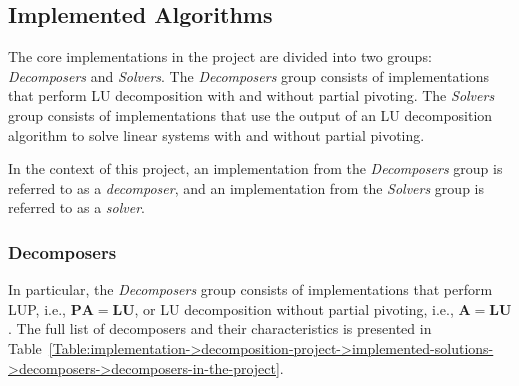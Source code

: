 \subsection{Implemented Algorithms}\label{Subsection:implementation->decomposition-project->implemented-algorithms}
The core implementations in the project are divided into two groups: \textit{Decomposers} and \textit{Solvers}.
The \textit{Decomposers} group consists of implementations that perform LU decomposition with and without partial pivoting.
The \textit{Solvers} group consists of implementations that use the output of an LU decomposition algorithm to solve linear systems with and without partial pivoting.

In the context of this project, an implementation from the \textit{Decomposers} group is referred to as a \textit{decomposer}, and an implementation from the \textit{Solvers} group is referred to as a \textit{solver}.

\subsubsection{Decomposers}\label{Subsection:implementation->decomposition-project->implemented-solutions->decomposers}
In particular, the \textit{Decomposers} group consists of implementations that perform LUP, i.e., $\mathbf{PA} = \mathbf{LU}$, or LU decomposition without partial pivoting, i.e., $\mathbf{A} = \mathbf{LU}$.
The full list of decomposers and their characteristics is presented in Table~\ref{Table:implementation->decomposition-project->implemented-solutions->decomposers->decomposers-in-the-project}.

